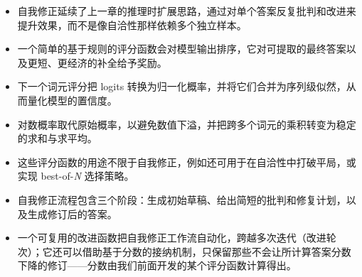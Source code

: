 \begin{itemize}
\item 自我修正延续了上一章的推理时扩展思路，通过对单个答案反复批判和改进来提升效果，而不是像自洽性那样依赖多个独立样本。
\item 一个简单的基于规则的评分函数会对模型输出排序，它对可提取的最终答案以及更短、更经济的补全给予奖励。
\item 下一个词元评分把 logits 转换为归一化概率，并将它们合并为序列级似然，从而量化模型的置信度。
\item 对数概率取代原始概率，以避免数值下溢，并把跨多个词元的乘积转变为稳定的求和与求平均。
\item 这些评分函数的用途不限于自我修正，例如还可用于在自洽性中打破平局，或实现 best-of-\emph{N} 选择策略。
\item 自我修正流程包含三个阶段：生成初始草稿、给出简短的批判和修复计划，以及生成修订后的答案。
\item 一个可复用的改进函数把自我修正工作流自动化，跨越多次迭代（改进轮次）；它还可以借助基于分数的接纳机制，只保留那些不会让所计算答案分数下降的修订——分数由我们前面开发的某个评分函数计算得出。
\end{itemize}
